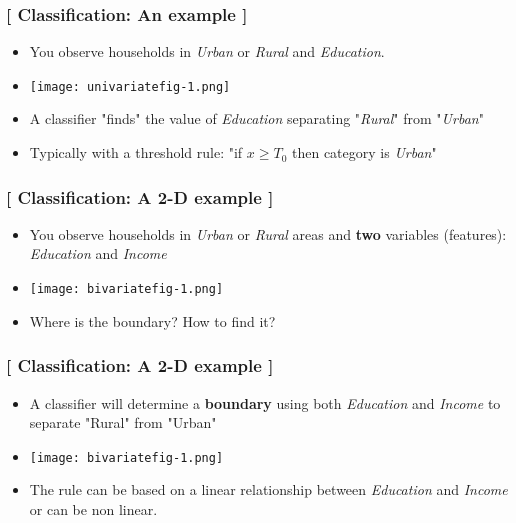 \documentclass[xcolor=x11names,compress, aspectratio=169]{beamer}
\renewcommand{\(}{\begin{columns}}
\renewcommand{\)}{\end{columns}}
\newcommand{\<}[1]{\begin{column}{#1}}
\renewcommand{\>}{\end{column}}
\begin{document}
\begin{frame} %
\frametitle{\textcolor{brique}{[ Classification:  An example ]}}
\pause
\begin{itemize}[<+->]
  \item You observe households in \textit{Urban} or \textit{Rural} and \textit{Education}.
  \item[] \begin{center}\texttt{[image: univariatefig-1.png]} \end{center}
  \item A classifier "finds" the value of \textit{Education} separating  "\textit{Rural}" from  "\textit{Urban}"
  \item[] Typically  with a threshold rule: \hspace{1cm} "if $x \geq T_0$  then  category is \textit{Urban}"
\end{itemize}
\end{frame}



\begin{frame} %
\frametitle{\textcolor{brique}{[ Classification:  A 2-D example ]}}
\pause
\begin{itemize}[<+->]
  \item You observe households in \textit{Urban} or \textit{Rural} areas and \textbf{two} variables (features): \textit{Education} and \textit{Income}
  \item[] \begin{center}\texttt{[image: bivariatefig-1.png]} \end{center}
  \item[] Where is the boundary?  How to find it?
\end{itemize}
\end{frame}




\begin{frame} %
\frametitle{\textcolor{brique}{[ Classification:  A 2-D example ]}}
\pause
\begin{itemize}[<+->]
   \item A classifier will determine a\textbf{ boundary} using both \textit{Education}  and \textit{Income} to separate "Rural" from "Urban"
   \item[] \begin{center}\texttt{[image: bivariatefig-1.png]} \end{center}
  \item The rule can be based on a linear relationship between \textit{Education}  and \textit{Income} or can be non linear.
\end{itemize}
\end{frame}
\end{document}
